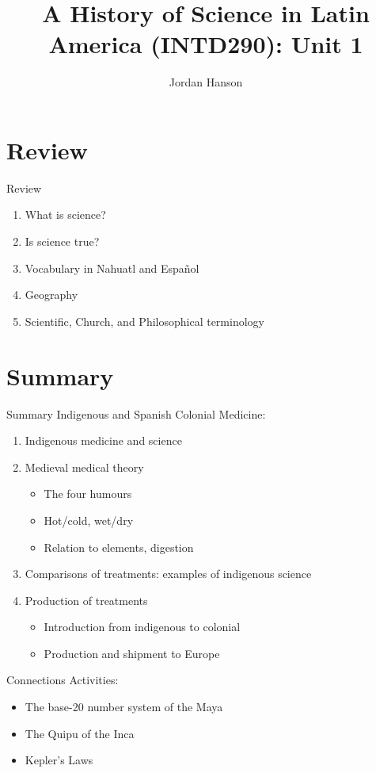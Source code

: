 \documentclass{beamer}
\title{A History of Science in Latin America (INTD290): Unit 1}
\author{Jordan Hanson}
\institute{Whittier College Department of Physics and Astronomy}
\begin{document}
\maketitle

\section{Review}

\begin{frame}{Review}
\begin{enumerate}
\item What is science?
\item Is science true?
\item Vocabulary in Nahuatl and Espa\~{n}ol
\item Geography
\item Scientific, Church, and Philosophical terminology
\end{enumerate}
\end{frame}

\section{Summary}

\begin{frame}{Summary}
\alert{Indigenous and Spanish Colonial Medicine}:
\begin{enumerate}
\item Indigenous medicine and science
\item Medieval medical theory
\begin{itemize}
\item The four humours
\item Hot/cold, wet/dry
\item Relation to elements, digestion
\end{itemize}
\item Comparisons of treatments: examples of indigenous science
\item Production of treatments
\begin{itemize}
\item Introduction from indigenous to colonial
\item Production and shipment to Europe
\end{itemize}
\end{enumerate}
\alert{Connections Activities}:
\begin{itemize}
\item The base-20 number system of the Maya
\item The Quipu of the Inca
\item Kepler's Laws
\end{itemize}
\end{frame}
\end{document}
